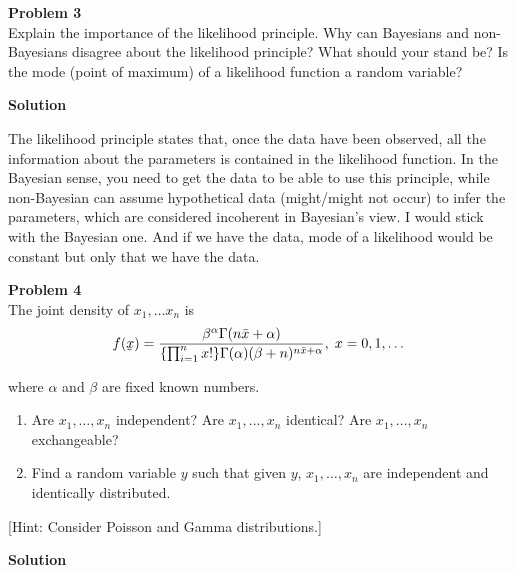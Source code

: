 \documentclass{article}
\newcommand{\ut}[1]{\underaccent{\tilde}{#1}}
\renewcommand{\vec}[1]{\ut{#1}}
\newcommand{\nx}{x_1,\dots,x_n}
\begin{document}
\newpage
\noindent
\Large{\textbf{Problem 3}}\normalsize
\\

Explain the importance of the likelihood principle. Why can Bayesians and
non-Bayesians disagree about the likelihood principle? What should your stand be? Is the mode (point of maximum) of a likelihood function a random variable?

\vspace{\baselineskip}
\noindent
\textbf{Solution}

The likelihood principle states that, once the data have been observed, all the information about the parameters is contained in the likelihood function. In the Bayesian sense, you need to get the data to be able to use this principle, while non-Bayesian can assume hypothetical data (might/might not occur) to infer the parameters, which are considered incoherent in Bayesian's view. I would stick with the Bayesian one. And if we have the data, mode of a likelihood would be constant but only that we have the data.

\vspace{\baselineskip}
\noindent
\Large{\textbf{Problem 4}}\normalsize
\\

The joint density of $x_1,\dots x_n$ is
\[f(\vec{x}) = \frac{\beta^{\alpha}\Gamma(n\bar{x} + \alpha)}{\{\prod_{i=1}^n x!\}\Gamma(\alpha)(\beta + n)^{n\bar{x} + \alpha}}, \; x = 0,1,\dots\]

where $\alpha$ and $\beta$ are fixed known numbers.
\begin{enumerate}
    \item Are $\nx$ independent? Are $\nx$ identical? Are $\nx$ exchangeable?
    \item Find a random variable $y$ such that given $y$, $\nx$ are independent and identically distributed.
\end{enumerate}

[Hint: Consider Poisson and Gamma distributions.]

\vspace{\baselineskip}
\noindent
\textbf{Solution}
\end{document}
